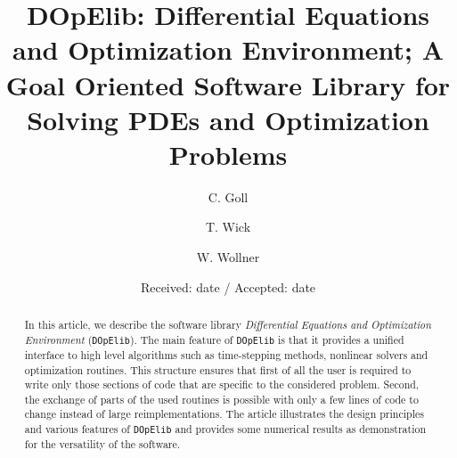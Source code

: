 \documentclass[smallextended]{svjour3}       %
\numberwithin{equation}{section}
\newcommand{\dope}{\texttt{DOpElib}}
\begin{document}
\title{DOpElib: Differential Equations and Optimization Environment; A Goal Oriented Software Library for Solving PDEs and Optimization Problems}



\author{C. Goll \and T. Wick \and W. Wollner}



\date{Received: date / Accepted: date}


\maketitle

\begin{abstract}
In this article, we describe the software library 
\textit{Differential Equations and Optimization Environment} (\dope{}).
The main feature of \dope{} is that it provides a unified interface to high level algorithms 
such as time-stepping methods, nonlinear solvers and optimization routines. This structure ensures 
that first of all the user is required to write only those sections of code that are specific to 
the considered problem. Second, the exchange of parts of the used routines is possible 
with only a few lines of code to change instead of large reimplementations.
The article illustrates the design principles and various features
of \dope{} and provides some 
numerical results as demonstration for the versatility of the software.
\end{abstract}
\end{document}
